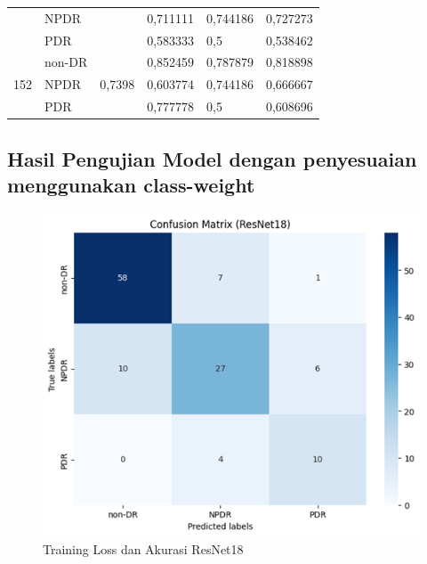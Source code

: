 \begin{table}[H]
\begin{center}
\begin{tabular}{clclll}
                                  & NPDR                      &                         & 0,711111                 & 0,744186                & 0,727273               \\ 
                                  & PDR                       &                         & 0,583333                 & 0,5                     & 0,538462               \\ \cline{1-6}
            \multirow{3}{*}{152}  & non-DR                    & \multirow{3}{*}{0,7398} & 0,852459                 & 0,787879                & 0,818898               \\
                                  & NPDR                      &                         & 0,603774                 & 0,744186                & 0,666667               \\
                                  & PDR                       &                         & 0,777778                 & 0,5                     & 0,608696               \\ \cline{1-6}
            \end{tabular}
        \end{center}
    \end{table}


\subsection{Hasil Pengujian Model dengan penyesuaian menggunakan class-weight}

    \begin{figure}[H]
        \includegraphics[scale=0.75]{gambar/confusionMatrixResnet18class-weighted.png}
        \caption{Training Loss dan Akurasi ResNet18}
        \label{fig:GraphResNet18class}
    \end{figure}

